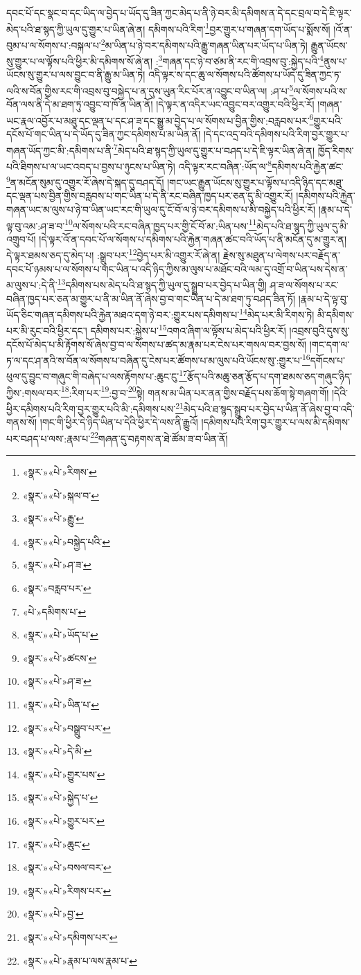 དབང་པོ་དང་སྣང་བ་དང་ཡིད་ལ་བྱེད་པ་ཡོད་དུ་ཟིན་ཀྱང་མེད་པ་ནི་ཉེ་བར་མི་དམིགས་ན་དེ་དང་བྲལ་བ་དེ་ཇི་ལྟར་མེད་པའི་ཐ་སྙད་ཀྱི་ཡུལ་དུ་གྱུར་པ་ཡིན་ཞེ་ན། དམིགས་པའི་རིག་\footnote{«སྣར་»«པེ་»རིགས་}བྱར་གྱུར་པ་གཞན་དག་ཡོད་པ་སྨོས་སོ། །འོ་ན་བུམ་པ་ལ་སོགས་པ་:བསྐལ་པ་\footnote{«སྣར་»«པེ་»སྐལ་བ་}མ་ཡིན་པ་ཉེ་བར་དམིགས་པའི་རྒྱུ་གཞན་ཡིན་པར་ཡོད་པ་ཡིན་ཏེ། རྒྱུན་ཡོངས་སུ་གྱུར་པ་ལ་ལྟོས་པའི་ཕྱིར་མི་དམིགས་སོ་ཞེ་ན། :\footnote{«སྣར་»«པེ་»རྒྱུ་}གཞན་དང་ཉེ་བ་ཙམ་ནི་རང་གི་འབྲས་བུ་:སྐྱེད་པའི་\footnote{«སྣར་»«པེ་»བསྐྱེད་པའི་}ནུས་པ་ཡོངས་སུ་གྱུར་པ་ལས་བྱུང་བ་ནི་རྒྱུ་མ་ཡིན་ཏེ། འདི་ལྟར་ས་དང་ཆུ་ལ་སོགས་པའི་ཚོགས་པ་ཡོད་དུ་ཟིན་ཀྱང་ཏ་ལའི་ས་བོན་གྱིས་རང་གི་འབྲས་བུ་བསྐྱེད་པ་ན་དུས་ཡུན་རིང་པོར་ན་འབྱུང་བ་ཡིན་ལ། :ཤ་པ་\footnote{«སྣར་»«པེ་»ཤ་ཟ་}ལ་སོགས་པའི་ས་བོན་ལས་ནི་དེ་མ་ཐག་ཏུ་འབྱུང་བ་ཁོ་ན་ཡིན་ནོ། །དེ་ལྟར་ན་འདིར་ཡང་འབྱུང་བར་འགྱུར་བའི་ཕྱིར་རོ། །གཞན་ཡང་རྣལ་འབྱོར་པ་མཐུ་དང་ལྡན་པ་དང་ཤ་ཟ་དང་སྒྱུ་མ་བྱེད་པ་ལ་སོགས་པ་བྱིན་གྱིས་:བརླབས་པར་\footnote{«སྣར་»བརླབ་པར་}གྱུར་པའི་དངོས་པོ་གང་ཡིན་པ་དེ་ཡོད་དུ་ཟིན་ཀྱང་དམིགས་པ་མ་ཡིན་ནོ། །དེ་དང་འདྲ་བའི་དམིགས་པའི་རིག་བྱར་གྱུར་པ་གཞན་ཡོད་ཀྱང་མི་:དམིགས་པ་ནི་\footnote{«པེ་»དམིགས་པ་}མེད་པའི་ཐ་སྙད་ཀྱི་ཡུལ་དུ་གྱུར་པ་བཤད་པ་དེ་ཇི་ལྟར་ཡིན་ཞེ་ན། ཁྱོད་རིགས་པའི་ཐིགས་པ་ལ་ཡང་འབད་པ་བྱས་པ་ཉུངས་པ་ཡིན་ཏེ། འདི་ལྟར་རང་བཞིན་:ཡོད་ལ་\footnote{«སྣར་»«པེ་»ཡོད་པ་}དམིགས་པའི་རྐྱེན་ཚང་\footnote{«སྣར་»«པེ་»ཚངས་}ན་མངོན་སུམ་དུ་འགྱུར་རོ་ཞེས་དེ་སྐད་དུ་བཤད་དོ། །གང་ཡང་རྒྱུན་ཡོངས་སུ་གྱུར་པ་ལྟོས་པ་འདི་ཉིད་དང་མཐུ་དང་ལྡན་པས་བྱིན་གྱིས་བརླབས་པ་གང་ཡིན་པ་དེ་ནི་རང་བཞིན་ཁྱད་པར་ཅན་དུ་མི་འགྱུར་རོ། །དམིགས་པའི་རྐྱེན་གཞན་ཡང་མ་ལུས་པ་ཉེ་བ་ཡིན་ཡང་རང་གི་ཡུལ་དུ་ངོ་བོ་ལ་ཉེ་བར་དམིགས་པ་མི་བསྐྱེད་པའི་ཕྱིར་རོ། །རྣམ་པ་དེ་ལྟ་བུ་འམ་:ཤ་ཟ་བ་\footnote{«སྣར་»«པེ་»ཤ་ཟ་}ལ་སོགས་པའི་རང་བཞིན་ཁྱད་པར་གྱི་ངོ་བོ་མ་:ཡིན་པས་\footnote{«སྣར་»«པེ་»ཡིན་པ་}མེད་པའི་ཐ་སྙད་ཀྱི་ཡུལ་དུ་མི་འགྲུབ་པོ། །དེ་ལྟར་འོ་ན་དབང་པོ་ལ་སོགས་པ་དམིགས་པའི་རྐྱེན་གཞན་ཚང་བའི་ཡོད་པ་ནི་མངོན་དུ་མ་གྱུར་ན། དེ་ལྟར་ཐམས་ཅད་དུ་མེད་པ། :སྒྲུབ་པར་\footnote{«སྣར་»«པེ་»བསྒྲུབ་པར་}བྱེད་པར་མི་འགྱུར་རོ་ཞེ་ན། རྗེས་སུ་མཐུན་པ་ལེགས་པར་བརྗོད་ན་དབང་པོ་ཉམས་པ་ལ་སོགས་པ་གང་ཡིན་པ་འདི་ཉིད་ཀྱིས་མ་ལུས་པ་མཐོང་བའི་ལམ་དུ་འགྲོ་བ་ཡིན་པས་དེས་ན་མ་ལུས་པ་:དེ་ནི་\footnote{«སྣར་»«པེ་»དེ་མི་}དམིགས་པས་མེད་པའི་ཐ་སྙད་ཀྱི་ཡུལ་དུ་སྒྲུབ་པར་བྱེད་པ་ཡིན་གྱི། ཤ་ཟ་ལ་སོགས་པ་རང་བཞིན་ཁྱད་པར་ཅན་མ་གྱུར་པ་ནི་མ་ཡིན་ནོ་ཞེས་བྱ་བ་གང་ཡིན་པ་དེ་མ་ཐག་ཏུ་བཤད་ཟིན་ཏོ། །རྣམ་པ་དེ་ལྟ་བུ་ཡོད་ཅིང་གཞན་དམིགས་པའི་རྐྱེན་མཐའ་དག་ཉེ་བར་:གྱུར་པས་དམིགས་པ་\footnote{«སྣར་»«པེ་»གྱུར་པས་}མེད་པར་མི་རིགས་ཏེ། མི་དམིགས་པར་མི་རུང་བའི་ཕྱིར་དང་། དམིགས་པར་:སྐྱེས་པ་\footnote{«སྣར་»«པེ་»སྐྱེད་པ་}འགའ་ཞིག་ལ་ལྟོས་པ་མེད་པའི་ཕྱིར་རོ། །འབྲས་བུའི་དུས་སུ་དངོས་པོ་མེད་པ་མི་རྟོགས་སོ་ཞེས་བྱ་བ་ལ་སོགས་པ་ཚད་མ་རྣམ་པར་ངེས་པར་གསལ་བར་བྱས་སོ། །གང་དག་ལ་ཏ་ལ་དང་ཤ་ནའི་ས་བོན་ལ་སོགས་པ་བཞིན་དུ་ངེས་པར་ཚོགས་པ་མ་ལུས་པའི་ཡོངས་སུ་:གྱུར་པ་\footnote{«སྣར་»«པེ་»གྱུར་པར་}དགོངས་པ་ཕུལ་དུ་བྱུང་བ་གཞུང་གི་བཞེད་པ་ལས་རྟོགས་པ་:ཆུང་ངུ་\footnote{«སྣར་»«པེ་»ཆུང་}རྩོད་པའི་མཆུ་ཅན་རྩོད་པ་དག་ཐམས་ཅད་གཞུང་ཉིད་ཀྱིས་:གསལ་བར་\footnote{«སྣར་»«པེ་»བསལ་བར་}:རིག་པར་\footnote{«སྣར་»«པེ་»རིགས་པར་}:བྱ་བ་\footnote{«སྣར་»«པེ་»བྱ་}སྟེ། གནས་མ་ཡིན་པར་ནན་གྱིས་བརྗོད་པས་ཆོག་སྟེ་གཞག་གོ། །དེའི་ཕྱིར་དམིགས་པའི་རིག་བྱར་གྱུར་པའི་མི་:དམིགས་པས་\footnote{«སྣར་»«པེ་»དམིགས་པར་}མེད་པའི་ཐ་སྙད་སྒྲུབ་པར་བྱེད་པ་ཡིན་ནོ་ཞེས་བྱ་བ་འདི་གནས་སོ། །གང་གི་ཕྱིར་དེ་ཉིད་ཡིན་པ་དེའི་ཕྱིར་དེ་ལས་ནི་རྒྱུའོ། །དམིགས་པའི་རིག་བྱར་གྱུར་པ་ལས་མི་དམིགས་པར་བཤད་པ་ལས་:རྣམ་པ་\footnote{«སྣར་»«པེ་»རྣམ་པ་ལས་རྣམ་པ་}གཞན་དུ་བརྟགས་ན་ཐེ་ཚོམ་ཟ་བ་ཡིན་ནོ། 